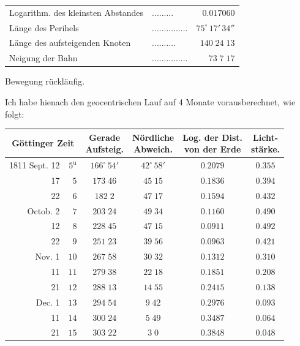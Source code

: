 \begin{center}\fontsize{10}{12}\selectfont\setlength{\tabcolsep}{4pt}\renewcommand{\arraystretch}{1.15}\begin{tabular}{llr}
Logarithm. des kleinsten Abstandes & .\;.\;.\;.\;.\;.\;.\;.\;. & $0.017060$\\
Länge des Perihels & .\;.\;.\;.\;.\;.\;.\;.\;.\;.\;.\;.\;.\;.\;. & $75^\circ\,17'\,34''$\\
Länge des aufsteigenden Knoten & .\;.\;.\;.\;.\;.\;.\;.\;.\;. & $140\;24\;13$\\
Neigung der Bahn & .\;.\;.\;.\;.\;.\;.\;.\;.\;.\;.\;.\;.\;.\;. & $73\;7\;17$\\
\end{tabular}\end{center}
\noindent Bewegung rückläufig.

\par\indent Ich habe hienach den geocentrischen Lauf auf 4 Monate vorausberechnet, wie folgt:

\begin{center}\fontsize{10}{12}\selectfont\setlength{\tabcolsep}{4pt}\renewcommand{\arraystretch}{1.15}\begin{tabular}{rr|c|c|c|c}
\multicolumn{2}{c|}{Göttinger Zeit} & \shortstack{Gerade\\Aufsteig.} & \shortstack{Nördliche\\Abweich.} & \shortstack{Log. der Dist.\\von der Erde} & \shortstack{Licht-\\stärke.}\\
\hline
1811 Sept. 12 & $5^{\mathrm u}$ & $166^\circ\,54'$ & $42^\circ\,58'$ & $0.2079$ & $0.355$\\
17 & $5$ & $173\;46$ & $45\;15$ & $0.1836$ & $0.394$\\
22 & $6$ & $182\;2$ & $47\;17$ & $0.1594$ & $0.432$\\
Octob. 2 & $7$ & $203\;24$ & $49\;34$ & $0.1160$ & $0.490$\\
12 & $8$ & $228\;45$ & $47\;15$ & $0.0911$ & $0.492$\\
22 & $9$ & $251\;23$ & $39\;56$ & $0.0963$ & $0.421$\\
Nov. 1 & $10$ & $267\;58$ & $30\;32$ & $0.1312$ & $0.310$\\
11 & $11$ & $279\;38$ & $22\;18$ & $0.1851$ & $0.208$\\
21 & $12$ & $288\;13$ & $14\;55$ & $0.2415$ & $0.138$\\
Dec. 1 & $13$ & $294\;54$ & $9\;42$ & $0.2976$ & $0.093$\\
11 & $14$ & $300\;24$ & $5\;49$ & $0.3487$ & $0.064$\\
21 & $15$ & $303\;22$ & $3\;0$ & $0.3848$ & $0.048$\\
\end{tabular}\end{center}

